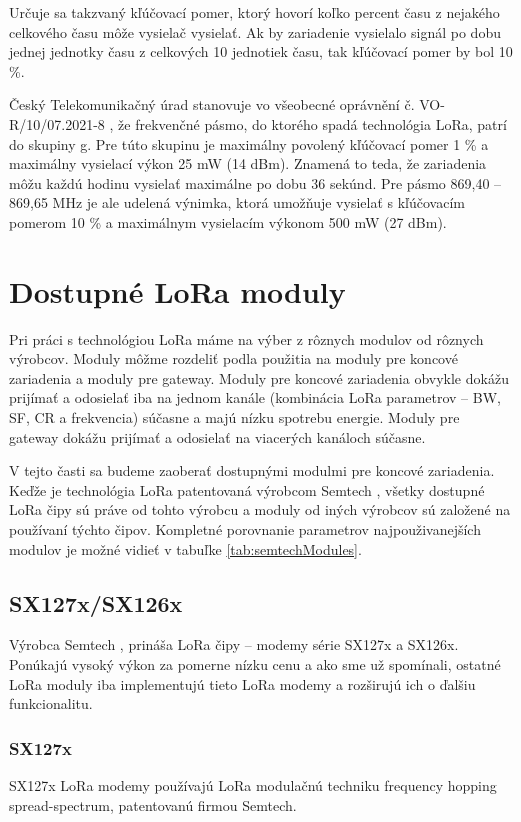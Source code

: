 \documentclass[slovak,master]{diploma}
\begin{document}
Určuje sa takzvaný kľúčovací pomer, ktorý hovorí koľko percent času z nejakého celkového času môže vysielač vysielať.
Ak by zariadenie vysielalo signál po dobu jednej jednotky času z celkových 10 jednotiek času, tak kľúčovací pomer by bol 10 \%.

Český Telekomunikačný úrad stanovuje vo všeobecné oprávnění č. VO-R/10/07.2021-8 \cite{vor}, že 
frekvenčné pásmo, do ktorého spadá technológia LoRa, patrí do skupiny g. Pre túto skupinu je maximálny povolený kľúčovací pomer 1 \% a maximálny 
vysielací výkon 25 mW (14 dBm). Znamená to teda, že zariadenia môžu každú hodinu vysielať maximálne po dobu 36 sekúnd.
Pre pásmo 869,40 -- 869,65 MHz je ale udelená výnimka, ktorá umožňuje vysielať s kľúčovacím pomerom 10 \% a maximálnym vysielacím výkonom 500 mW (27 dBm).

\chapter{Dostupné LoRa moduly }
Pri práci s technológiou LoRa máme na výber z rôznych modulov od rôznych výrobcov.
Moduly môžme rozdeliť podla použitia na moduly pre koncové zariadenia a moduly pre gateway.
Moduly pre koncové zariadenia obvykle dokážu prijímať a odosielať iba na jednom kanále (kombinácia LoRa parametrov --  BW, SF, CR a frekvencia) súčasne a majú 
nízku spotrebu energie. Moduly pre gateway dokážu prijímať a odosielať na viacerých kanáloch súčasne.

V tejto časti sa budeme zaoberať dostupnými modulmi pre koncové zariadenia.
Keďže je technológia LoRa patentovaná výrobcom Semtech \cite{semtech}, všetky dostupné LoRa čipy sú práve od tohto výrobcu a moduly od iných výrobcov 
sú založené na používaní týchto čipov. Kompletné porovnanie parametrov najpouživanejších modulov je možné vidieť v tabuľke \ref{tab:semtechModules}.

\section{SX127x/SX126x}
Výrobca Semtech \cite{semtech}, prináša LoRa čipy -- modemy série SX127x a SX126x. Ponúkajú vysoký výkon za pomerne nízku cenu a ako sme už spomínali, ostatné LoRa moduly 
iba implementujú tieto LoRa modemy a rozširujú ich o ďalšiu funkcionalitu.

\subsection{SX127x}
SX127x LoRa modemy používajú LoRa modulačnú techniku frequency hopping spread-spectrum, patentovanú firmou Semtech.
\end{document}
